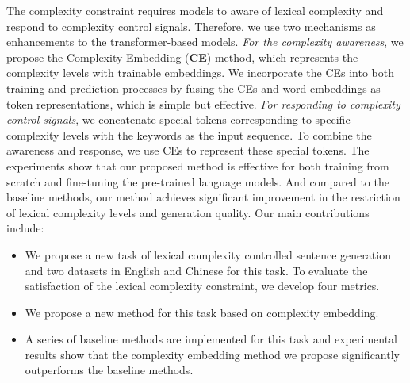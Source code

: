 \documentclass[11pt]{article}
\begin{document}

The complexity constraint requires models to aware of lexical complexity and respond to complexity control signals. Therefore, we use two mechanisms  as enhancements to the transformer-based models. \textit{For the complexity awareness}, we propose the Complexity Embedding (\textbf{CE}) method, which represents the complexity levels with trainable embeddings. We incorporate the CEs into both training and prediction processes by fusing the CEs and word embeddings as token representations, which is simple but effective. \textit{For responding to complexity control signals}, we concatenate special tokens corresponding to specific complexity levels with the keywords as the input sequence. To combine the awareness and response, we use CEs to represent these special tokens. The experiments show that our proposed method is effective for both training from scratch and fine-tuning the pre-trained language models. And compared to the baseline methods, our method achieves significant improvement in the restriction of lexical complexity levels and generation quality. Our main contributions include:
\begin{itemize}
\item We propose a new task of lexical complexity controlled sentence generation and two datasets in English and Chinese for this task. To evaluate the satisfaction of the lexical complexity constraint, we develop four metrics.

\item We propose a new method for this task based on complexity embedding.


\item A series of baseline methods are implemented for this task and experimental results show that the complexity embedding method we propose significantly outperforms the baseline methods.

\end{itemize}
\end{document}
